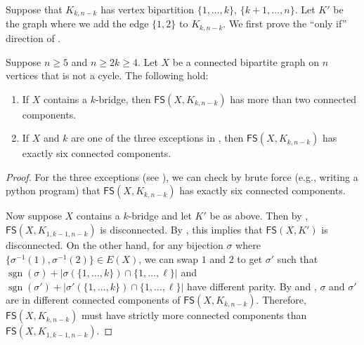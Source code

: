 \documentclass{mystyle}
\newcommand{\FS}{\mathsf{FS}}
\begin{document}
Suppose that $K_{k, n - k}$ has vertex bipartition $\{1, \ldots, k\}$, $\{k + 1, \ldots, n\}$. Let $K'$ be the graph where we add the edge $\{1, 2\}$ to $K_{k, n - k}$. We first prove the ``only if'' direction of .
\begin{proposition}\label{prop_more_than_two_comp}
    Suppose $n \geq 5$ and $n \geq 2k \geq 4$. Let $X$ be a connected bipartite graph on $n$ vertices that is not a cycle. The following hold:
    \begin{enumerate}
        \item If $X$ contains a $k$-bridge, then $\FS(X, K_{k, n - k})$ has more than two connected components. 
        \item If $X$ and $k$ are one of the three exceptions in , then $\FS(X, K_{k, n - k})$ has exactly six connected components. 
    \end{enumerate}
\end{proposition}
\begin{proof}
    For the three exceptions (see ), we can check by brute force (e.g., writing a python program) that $\FS(X, K_{k, n - k})$ has exactly six connected components. 
    
    Now suppose $X$ contains a $k$-bridge and let $K'$ be as above. Then by , $\FS(X, K_{1, k-1, n - k})$ is disconnected. By , this implies that $\FS(X, K')$ is disconnected. On the other hand, for any bijection $\sigma$ where $\{\sigma^{-1}(1), \sigma^{-1}(2)\} \in E(X)$, we can swap $1$ and $2$ to get $\sigma'$ such that $\operatorname{sgn}(\sigma) + |\sigma(\{1, \ldots, k\}) \cap \{1, \ldots, \ell\}|$ and $\operatorname{sgn}(\sigma') + |\sigma'(\{1, \ldots, k\}) \cap \{1, \ldots, \ell\}|$ have different parity. By  and , $\sigma$ and $\sigma'$ are in different connected components of $\FS(X, K_{k, n - k})$. Therefore, $\FS(X, K_{k, n - k})$ must have strictly more connected components than $\FS(X, K_{1, k-1, n - k})$. 
\end{proof}
\end{document}

